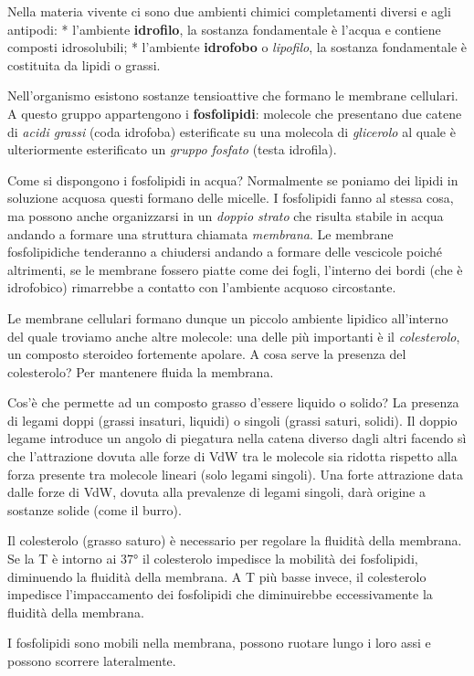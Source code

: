 \documentclass[]{article}
\begin{document}
Nella materia vivente ci sono due ambienti chimici completamenti diversi
e agli antipodi: * l'ambiente \textbf{idrofilo}, la sostanza
fondamentale è l'acqua e contiene composti idrosolubili; * l'ambiente
\textbf{idrofobo} o \emph{lipofilo}, la sostanza fondamentale è
costituita da lipidi o grassi.

Nell'organismo esistono sostanze tensioattive che formano le membrane
cellulari. A questo gruppo appartengono i \textbf{fosfolipidi}: molecole
che presentano due catene di \emph{acidi grassi} (coda idrofoba)
esterificate su una molecola di \emph{glicerolo} al quale è
ulteriormente esterificato un \emph{gruppo fosfato} (testa idrofila).

Come si dispongono i fosfolipidi in acqua? Normalmente se poniamo dei
lipidi in soluzione acquosa questi formano delle micelle. I fosfolipidi
fanno al stessa cosa, ma possono anche organizzarsi in un \emph{doppio
strato} che risulta stabile in acqua andando a formare una struttura
chiamata \emph{membrana}. Le membrane fosfolipidiche tenderanno a
chiudersi andando a formare delle vescicole poiché altrimenti, se le
membrane fossero piatte come dei fogli, l'interno dei bordi (che è
idrofobico) rimarrebbe a contatto con l'ambiente acquoso circostante.

Le membrane cellulari formano dunque un piccolo ambiente lipidico
all'interno del quale troviamo anche altre molecole: una delle più
importanti è il \emph{colesterolo}, un composto steroideo fortemente
apolare. A cosa serve la presenza del colesterolo? Per mantenere fluida
la membrana.

Cos'è che permette ad un composto grasso d'essere liquido o solido? La
presenza di legami doppi (grassi insaturi, liquidi) o singoli (grassi
saturi, solidi). Il doppio legame introduce un angolo di piegatura nella
catena diverso dagli altri facendo sì che l'attrazione dovuta alle forze
di VdW tra le molecole sia ridotta rispetto alla forza presente tra
molecole lineari (solo legami singoli). Una forte attrazione data dalle
forze di VdW, dovuta alla prevalenze di legami singoli, darà origine a
sostanze solide (come il burro).

Il colesterolo (grasso saturo) è necessario per regolare la fluidità
della membrana. Se la T è intorno ai 37° il colesterolo impedisce la
mobilità dei fosfolipidi, diminuendo la fluidità della membrana. A T più
basse invece, il colesterolo impedisce l'impaccamento dei fosfolipidi
che diminuirebbe eccessivamente la fluidità della membrana.

I fosfolipidi sono mobili nella membrana, possono ruotare lungo i loro
assi e possono scorrere lateralmente.
\end{document}
